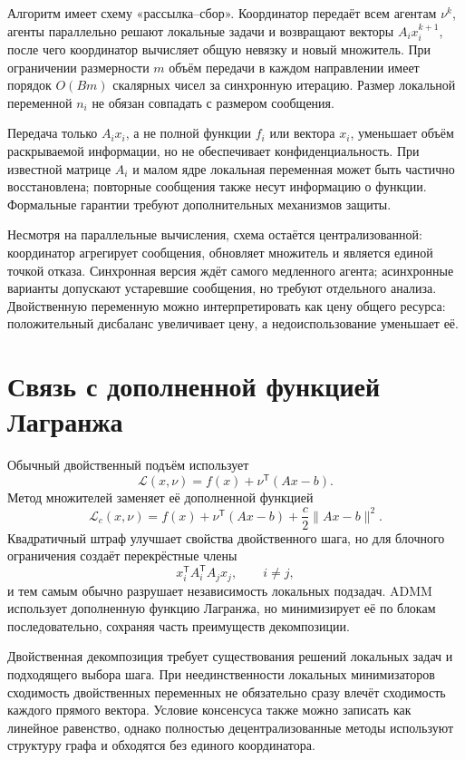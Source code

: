 Алгоритм имеет схему «рассылка--сбор». Координатор передаёт всем
агентам \(\nu^k\), агенты параллельно решают локальные задачи и
возвращают векторы \(A_ix_i^{k+1}\), после чего координатор вычисляет
общую невязку и новый множитель. При ограничении размерности \(m\)
объём передачи в каждом направлении имеет порядок \(O(Bm)\) скалярных
чисел за синхронную итерацию. Размер локальной переменной \(n_i\) не
обязан совпадать с размером сообщения.

Передача только \(A_ix_i\), а не полной функции \(f_i\) или вектора
\(x_i\), уменьшает объём раскрываемой информации, но не обеспечивает
конфиденциальность. При известной матрице \(A_i\) и малом ядре
локальная переменная может быть частично восстановлена; повторные
сообщения также несут информацию о функции. Формальные гарантии
требуют дополнительных механизмов защиты.

Несмотря на параллельные вычисления, схема остаётся централизованной:
координатор агрегирует сообщения, обновляет множитель и является
единой точкой отказа. Синхронная версия ждёт самого медленного агента;
асинхронные варианты допускают устаревшие сообщения, но требуют
отдельного анализа. Двойственную переменную можно интерпретировать как
цену общего ресурса: положительный дисбаланс увеличивает цену, а
недоиспользование уменьшает её.

\section{Связь с дополненной функцией Лагранжа}

Обычный двойственный подъём использует
\[
    \mathcal L(x,\nu)
    =
    f(x)+\nu^{\mathsf T}(Ax-b).
\]
Метод множителей заменяет её дополненной функцией
\[
    \mathcal L_c(x,\nu)
    =
    f(x)+\nu^{\mathsf T}(Ax-b)
    +
    \frac c2\lVert Ax-b\rVert^2.
\]
Квадратичный штраф улучшает свойства двойственного шага, но для
блочного ограничения создаёт перекрёстные члены
\[
    x_i^{\mathsf T}A_i^{\mathsf T}A_jx_j,
    \qquad
    i\ne j,
\]
и тем самым обычно разрушает независимость локальных подзадач. ADMM
использует дополненную функцию Лагранжа, но минимизирует её по блокам
последовательно, сохраняя часть преимуществ декомпозиции.

Двойственная декомпозиция требует существования решений локальных
задач и подходящего выбора шага. При неединственности локальных
минимизаторов сходимость двойственных переменных не обязательно сразу
влечёт сходимость каждого прямого вектора. Условие консенсуса также
можно записать как линейное равенство, однако полностью
децентрализованные методы используют структуру графа и обходятся без
единого координатора.
